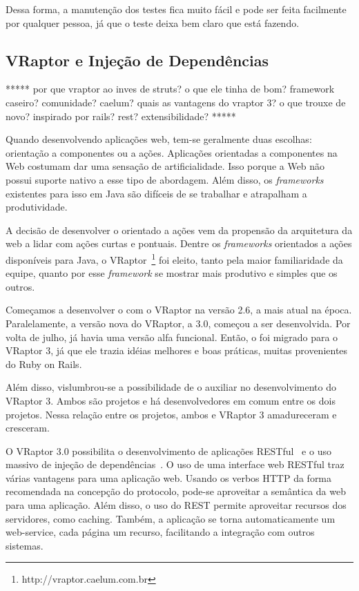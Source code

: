 Dessa forma, a manutenção dos testes fica muito fácil e pode ser feita facilmente por qualquer pessoa, já que o teste deixa bem claro que está fazendo.


\subsection{VRaptor e Injeção de Dependências}

*****
por que vraptor ao inves de struts? o que ele tinha de bom? framework caseiro? comunidade? caelum? quais as vantagens do vraptor 3? o que trouxe de novo? inspirado por rails? rest? extensibilidade?
*****

Quando desenvolvendo aplicações web, tem-se geralmente duas escolhas: orientação a componentes ou a ações. Aplicações orientadas a componentes na Web costumam dar uma sensação de artificialidade. Isso porque a Web não possui suporte nativo a esse tipo de abordagem. Além disso, os \textit{frameworks} existentes para isso em Java são difíceis de se trabalhar e atrapalham a produtividade. 

A decisão de desenvolver o \calopsita orientado a ações vem da propensão da arquitetura da web a lidar com ações curtas e pontuais. Dentre os \textit{frameworks} orientados a ações disponíveis para Java, o VRaptor~\footnote{http://vraptor.caelum.com.br} foi eleito, tanto pela maior familiaridade da equipe, quanto por esse \textit{framework} se mostrar mais produtivo e simples que os outros.

Começamos a desenvolver o \calopsita com o VRaptor na versão 2.6, a mais atual na época. Paralelamente, a versão nova do VRaptor, a 3.0, começou a ser desenvolvida. Por volta de julho, já havia uma versão alfa funcional. Então, o \calopsita foi migrado para o VRaptor 3, já que ele trazia idéias melhores
e boas práticas, muitas provenientes do Ruby on Rails. 

Além disso, vislumbrou-se a possibilidade de o \calopsita auxiliar no desenvolvimento do VRaptor 3. Ambos são projetos \opensource e há desenvolvedores em comum entre os dois projetos. Nessa relação entre os projetos, ambos \calopsita e VRaptor 3 amadureceram e cresceram.

O VRaptor 3.0 possibilita o desenvolvimento de aplicações RESTful~\cite{rest} e o uso massivo de injeção de dependências~\cite{di}. O uso de uma interface web RESTful traz várias vantagens para uma aplicação web. Usando os verbos HTTP da forma recomendada na concepção do protocolo, pode-se aproveitar a semântica da web para uma aplicação. Além disso, o uso do REST permite aproveitar recursos dos servidores, como caching. Também, a aplicação se torna automaticamente um web-service, cada página um recurso, facilitando a integração com outros sistemas.

